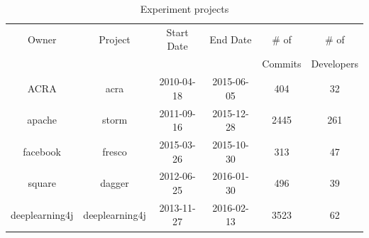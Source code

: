 \begin{table}[!hbp]
\begin{center}
    \begin{tabular}{|c|c|c|c|c|c|}
        \hline
        Owner & Project & Start Date & End Date & \# of & \# of \\
         & & & & Commits & Developers \\
        \hline
        ACRA & acra\protect\footnotemark & 2010-04-18 & 2015-06-05 & 404 & 32 \\
        apache & storm\protect\footnotemark & 2011-09-16 & 2015-12-28 & 2445 & 261 \\
        facebook & fresco\protect\footnotemark & 2015-03-26 & 2015-10-30 & 313 & 47 \\
        square & dagger\protect\footnotemark & 2012-06-25 & 2016-01-30 & 496 & 39 \\
        deeplearning4j & deeplearning4j\protect\footnotemark & 2013-11-27 & 2016-02-13 & 3523 & 62 \\
        \hline
    \end{tabular}
\end{center}
\caption{Experiment projects}
\label{tab:project_summary}
\end{table}

\addtocounter{footnote}{-4}

\addtocounter{footnote}{1}

\addtocounter{footnote}{1}

\addtocounter{footnote}{1}

\addtocounter{footnote}{1}


